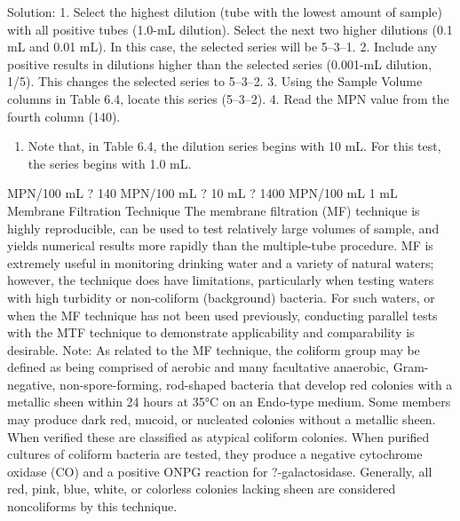 \documentclass{article}
\begin{document}
Solution: 1. Select the highest dilution (tube with the lowest amount of
sample) with all positive tubes (1.0-mL dilution). Select the next two
higher dilutions (0.1 mL and 0.01 mL). In this case, the selected series
will be 5--3--1. 2. Include any positive results in dilutions higher
than the selected series (0.001-mL dilution, 1/5). This changes the
selected series to 5--3--2. 3. Using the Sample Volume columns in Table
6.4, locate this series (5--3--2). 4. Read the MPN value from the fourth
column (140).

\begin{enumerate}

\item
  Note that, in Table 6.4, the dilution series begins with 10 mL. For
  this test, the series begins with 1.0 mL.
\end{enumerate}

MPN/100 mL ? 140 MPN/100 mL ? 10 mL ? 1400 MPN/100 mL 1 mL Membrane
Filtration Technique The membrane filtration (MF) technique is highly
reproducible, can be used to test relatively large volumes of sample,
and yields numerical results more rapidly than the multiple-tube
procedure. MF is extremely useful in monitoring drinking water and a
variety of natural waters; however, the technique does have limitations,
particularly when testing waters with high turbidity or non-coliform
(background) bacteria. For such waters, or when the MF technique has not
been used previously, conducting parallel tests with the MTF technique
to demonstrate applicability and comparability is desirable. Note: As
related to the MF technique, the coliform group may be defined as being
comprised of aerobic and many facultative anaerobic, Gram-negative,
non-spore-forming, rod-shaped bacteria that develop red colonies with a
metallic sheen within 24 hours at 35°C on an Endo-type medium. Some
members may produce dark red, mucoid, or nucleated colonies without a
metallic sheen. When verified these are classified as atypical coliform
colonies. When purified cultures of coliform bacteria are tested, they
produce a negative cytochrome oxidase (CO) and a positive ONPG reaction
for ?-galactosidase. Generally, all red, pink, blue, white, or colorless
colonies lacking sheen are considered noncoliforms by this technique.
\end{document}
